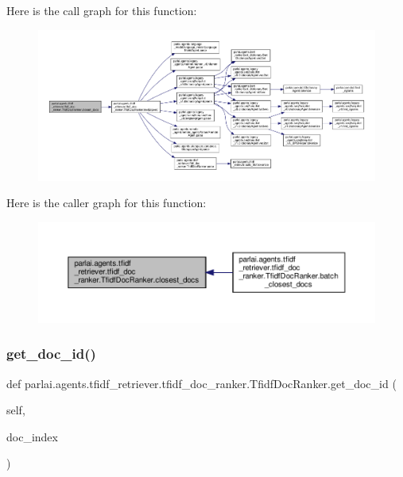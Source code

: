 Here is the call graph for this function\+:
\nopagebreak
\begin{figure}[H]
\begin{center}
\leavevmode
\includegraphics[width=350pt]{classparlai_1_1agents_1_1tfidf__retriever_1_1tfidf__doc__ranker_1_1TfidfDocRanker_a0573e296758121d2c40563e93acdf366_cgraph}
\end{center}
\end{figure}
Here is the caller graph for this function\+:
\nopagebreak
\begin{figure}[H]
\begin{center}
\leavevmode
\includegraphics[width=350pt]{classparlai_1_1agents_1_1tfidf__retriever_1_1tfidf__doc__ranker_1_1TfidfDocRanker_a0573e296758121d2c40563e93acdf366_icgraph}
\end{center}
\end{figure}
\mbox{\label{classparlai_1_1agents_1_1tfidf__retriever_1_1tfidf__doc__ranker_1_1TfidfDocRanker_a4ef2a607fd94e1ad9cf44239c8910378}} 
\subsubsection{\texorpdfstring{get\+\_\+doc\+\_\+id()}{get\_doc\_id()}}
{\footnotesize\ttfamily def parlai.\+agents.\+tfidf\+\_\+retriever.\+tfidf\+\_\+doc\+\_\+ranker.\+Tfidf\+Doc\+Ranker.\+get\+\_\+doc\+\_\+id (\begin{DoxyParamCaption}\item[{}]{self,  }\item[{}]{doc\+\_\+index }\end{DoxyParamCaption})}


